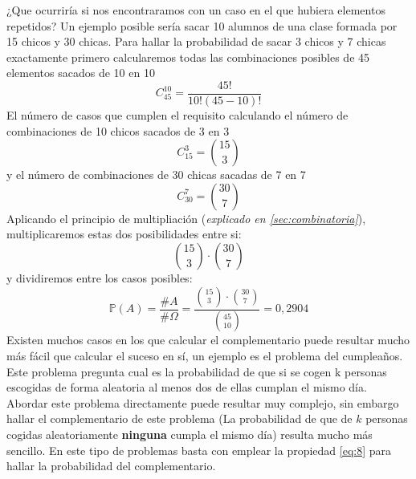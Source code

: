 \documentclass[11pt]{article}
\newcommand{\prob}{\mathbb{P}}
\newcommand{\OMG}{\varOmega}
\theoremstyle{plain}
\begin{document}
                 ¿Que ocurriría si nos encontraramos con un caso en el que hubiera elementos repetidos? Un ejemplo posible sería sacar 10 alumnos de una clase formada por 15 chicos y 30 chicas. Para hallar la probabilidad de sacar 3 chicos y 7 chicas exactamente primero calcularemos todas las combinaciones posibles de 45 elementos sacados de 10 en 10 \[C_{45}^{10} =\frac{45!}{10!(45-10)!} \] El número de casos que cumplen el requisito calculando el número de combinaciones de 10 chicos sacados de 3 en 3 \[C_15^3 = \binom{15}{3}\] y el número de combinaciones de 30 chicas sacadas de 7 en 7 \[C_30^7  = \binom{30}{7}\] Aplicando el principio de multipliación (\textit{explicado en \ref{sec:combinatoria}}), multiplicaremos estas dos posibilidades entre si: \[\binom{15}{3} \cdot \binom{30}{7}\] y dividiremos entre los casos posibles: 
                 \begin{equation}
                     \prob (A) = \frac{\# A}{\#\OMG} = \frac{\binom{15}{3} \cdot \binom{30}{7}}{\binom{45}{10}} = 0,2904
                 \end{equation}
                Existen muchos casos en los que calcular el complementario puede resultar mucho más fácil que calcular el suceso en sí, un ejemplo es el problema del cumpleaños. Este problema pregunta cual es la probabilidad de que si se cogen k personas escogidas de forma aleatoria al menos dos de ellas cumplan el mismo día. Abordar este problema directamente puede resultar muy complejo, sin embargo hallar el complementario de este problema (La probabilidad de que de $k$ personas cogidas aleatoriamente \textbf{ninguna} cumpla el mismo día) resulta mucho más sencillo. En este tipo de problemas basta con emplear la propiedad \ref{eq:8} para hallar la probabilidad del complementario.
\end{document}
